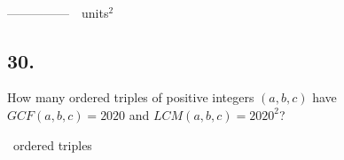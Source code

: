 \documentclass[12pt]{article}
\begin{document}
\nopagebreak

\begin{minipage}[b]{\linewidth}
\fbox{\phantom{ANSWER}}\\
\mbox{---------------}~~units$^2$\\
\fbox{\phantom{ANSWER}}
\end{minipage}


\begin{answer}
%
\end{answer}

\begin{answer}
\newpage
\end{answer}

\subsection*{30.}
How many ordered triples of positive integers $(a,b,c)$ have $GCF(a,b,c)=2020$ and $LCM(a,b,c)=2020^2$?

\nopagebreak

\fbox{\phantom{ANSWER}}~ordered triples
\end{document}
